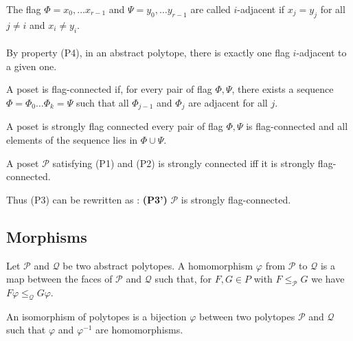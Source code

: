 \begin{definition}
  The flag $\Phi = x_0, \dots x_{r-1}$ and $\Psi = y_0, \dots y_{r-1}$ are called $i$-adjacent if $x_j = y_j$ for all $j \neq i$ and $x_i \neq y_i$.
\end{definition}

\paragraph{}
By property (P4), in an abstract polytope, there is exactly one flag $i$-adjacent to a given one.

\begin{definition}
  A poset is flag-connected if, for every pair of flag $\Phi, \Psi$, there exists a sequence $\Phi = \Phi_0 \dots \Phi_k = \Psi$ such that all $\Phi_{j-1}$ and $\Phi_j$ are adjacent for all $j$.
\end{definition}

\begin{definition}
  A poset is strongly flag connected every pair of flag $\Phi, \Psi$ is flag-connected and all elements of the sequence lies in $\Phi \cup \Psi$.
\end{definition}

\begin{proposition}
  A poset $\mathcal P$ satisfying (P1) and (P2) is strongly connected iff it is strongly flag-connected.
\end{proposition}

Thus (P3) can be rewritten as : \textbf{(P3')} $\mathcal P$ is strongly flag-connected.

\subsection{Morphisms}

\begin{definition}
  Let $\mathcal P$ and $\mathcal Q$ be two abstract polytopes. A homomorphism $\varphi$ from $\mathcal P$ to $\mathcal Q$ is a map between the faces of $\mathcal P$ and $\mathcal Q$ such that, for $F, G \in P$ with $F \le_{\mathcal P} G$ we have $F\varphi \le_{\mathcal Q} G\varphi$.
\end{definition}

\begin{definition}
  An isomorphism of polytopes is a bijection $\varphi$ between two polytopes $\mathcal P$ and $\mathcal Q$ such that $\varphi$ and $\varphi^{-1}$ are homomorphisms.
\end{definition}

